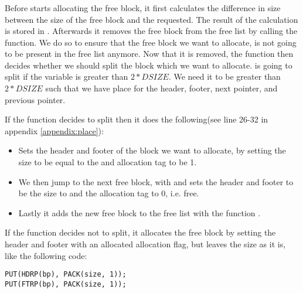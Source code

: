 \subsubsection{}
Before  starts allocating the free block, it first calculates the difference in size between the size of the free block and the requested. The result of the calculation is stored in .
Afterwards it removes the free block from the free list by calling the  function. We do so to ensure that the free block we want to allocate, 
is not going to be present in the free list anymore. Now that it is removed, the function then decides whether we should split the block which we want to allocate. 
 is going to split if the variable  is greater than $2 * DSIZE$.
We need it to be greater than $2 * DSIZE$ such that we have place for the header, footer, next pointer, and previous pointer. 

If the function decides to split then it does the following(see line 26-32 in appendix \ref{appendix:place}): 
\begin{itemize}
    \item Sets the header and footer of the block we want to allocate, by setting the size to be equal to the  and allocation tag to be 1.
    \item We then jump to the next free block, with  and sets the header and footer to be the size to  and the allocation tag to 0, i.e. free.
    \item Lastly it adds the new free block to the free list with the function .
\end{itemize}

If the  function decides not to split, it allocates the free block by setting the header and footer with an allocated allocation flag, but leaves the size as it is, like the following code:
\begin{lstlisting}
PUT(HDRP(bp), PACK(size, 1));
PUT(FTRP(bp), PACK(size, 1)); 
\end{lstlisting}

